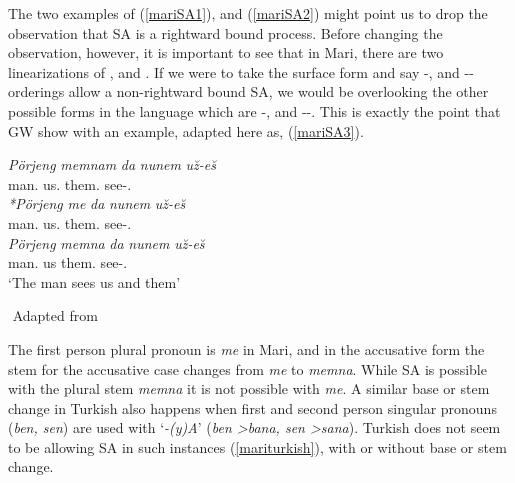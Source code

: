 The two examples of (\ref{mariSA1}), and (\ref{mariSA2}) might point us to drop the observation that SA is a rightward bound process. Before changing the observation, however, it is important to see that in Mari, there are two linearizations of {\Poss}, {\Pl} and {\Lcase}. If we were to take the surface form and say {\Lcase}-{\Poss}, and {\Pl}-{\Lcase}-{\Poss} orderings allow a non-rightward bound SA, we would be overlooking the other possible forms in the language which are {\Poss}-{\Lcase}, and {\Poss}-{\Pl}-{\Lcase}. This is exactly the point that GW show with an example, adapted here as, (\ref{mariSA3}).

\begin{exe}
 \ex \label{mariSA3}
    \begin{xlist}
        \ex \label{mariSA3a}
        \gll 
        \textit{Pörjeng} \textit{memnam} \textit{da} \textit{nunem} \textit{u\u{z}-e\u{s}} \\ man.{\Nom} us.{\Acc} {\And} them.{\Acc} see-{\Third}{\Sg}.{\Prs} \\
        
        \ex \label{mariSA3c}
        \gll 
        \textit{*Pörjeng} \textit{me} \textit{da} \textit{nunem} \textit{u\u{z}-e\u{s}} \\ man.{\Nom} us.{\Acc} {\And} them.{\Acc} see-{\Third}{\Sg}.{\Prs} \\
        
        \ex \label{mariSA3b} 
        \gll
        \textit{Pörjeng} \textit{memna} \textit{da} \textit{nunem} \textit{u\u{z}-e\u{s}} \\ man.{\Nom} us {\And} them.{\Acc} see-{\Third}{\Sg}.{\Prs} \\
        \glt `The man sees us and them'
    \end{xlist}
    ${}$ \hfill Adapted from \cite{guseva2017postsyntactic}
\end{exe}

The first person plural pronoun is \textit{me} in Mari, and in the accusative form the stem for the accusative case changes from \textit{me} to \textit{memna}. While SA is possible with the plural stem \textit{memna} it is not possible with \textit{me}. A similar base or stem change in Turkish also happens when first and second person singular pronouns (\textit{ben, sen}) are used with {\Dat} `\textit{-(y)A}' (\textit{ben \textgreater bana, sen \textgreater sana}). Turkish does not seem to be allowing SA in such instances (\ref{mariturkish}), with or without base or stem change.

